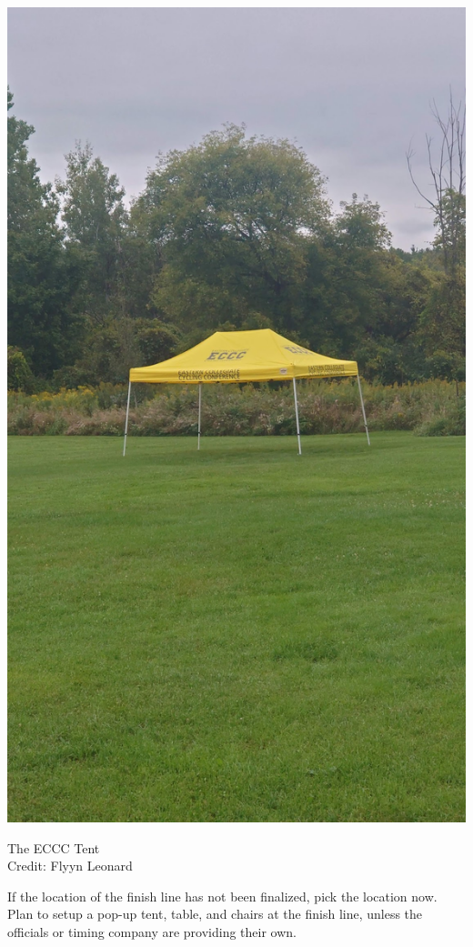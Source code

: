 \documentclass[
  letterpaper, %
  fontsize=10pt, %
  twoside=true,
  chapterentrydots=true, %
  numbers=noenddot,
  fontmethod=tex,
]{kaobook}
\begin{document}
\begin{marginfigure}[60pt]
\includegraphics{eccc_tent.jpg}
\caption[The ECCC Tent]{The ECCC Tent\\
          Credit: Flyyn Leonard}
\end{marginfigure}

If the location of the finish line has not been finalized, pick the location now.
Plan to setup a pop-up tent, table, and chairs at the finish line, unless the officials or timing company are providing their own.
\end{document}
